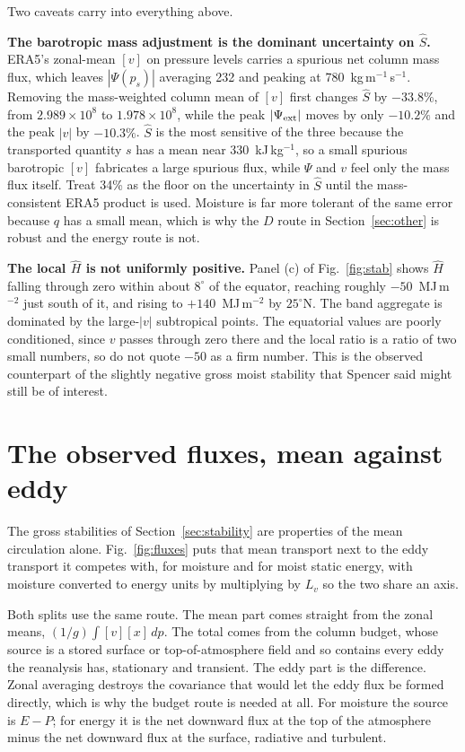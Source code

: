 \documentclass[11pt]{article}
\newcommand{\Shat}{\hat S}
\newcommand{\Hhat}{\hat H}
\begin{document}
Two caveats carry into everything above.

\textbf{The barotropic mass adjustment is the dominant uncertainty on
$\Shat$.} ERA5's zonal-mean $[v]$ on pressure levels carries a spurious net
column mass flux, which leaves $|\Psi(p_s)|$ averaging 232 and peaking at
780~kg\,m$^{-1}$\,s$^{-1}$. Removing the mass-weighted column mean of $[v]$
first changes $\Shat$ by $-33.8\%$, from $2.989\times10^{8}$ to
$1.978\times10^{8}$, while the peak $|\Psi_{\rm ext}|$ moves by only $-10.2\%$
and the peak $|v|$ by $-10.3\%$. $\Shat$ is the most sensitive of the three
because the transported quantity $s$ has a mean near 330~kJ\,kg$^{-1}$, so a
small spurious barotropic $[v]$ fabricates a large spurious flux, while $\Psi$
and $v$ feel only the mass flux itself. Treat 34\% as the floor on the
uncertainty in $\Shat$ until the mass-consistent ERA5 product is used.
Moisture is far more tolerant of the same error because $q$ has a small mean,
which is why the $D$ route in Section~\ref{sec:other} is robust and the energy
route is not.

\textbf{The local $\Hhat$ is not uniformly positive.} Panel (c) of
Fig.~\ref{fig:stab} shows $\Hhat$ falling through zero within about
$8^\circ$ of the equator, reaching roughly $-50$~MJ\,m$^{-2}$ just south of it,
and rising to $+140$~MJ\,m$^{-2}$ by $25^\circ$N. The band aggregate is
dominated by the large-$|v|$ subtropical points. The equatorial values are
poorly conditioned, since $v$ passes through zero there and the local ratio is
a ratio of two small numbers, so do not quote $-50$ as a firm number. This is
the observed counterpart of the slightly negative gross moist stability that
Spencer said might still be of interest.

\section{The observed fluxes, mean against eddy}
\label{sec:fluxes}

The gross stabilities of Section~\ref{sec:stability} are properties of the mean
circulation alone. Fig.~\ref{fig:fluxes} puts that mean transport next to the
eddy transport it competes with, for moisture and for moist static energy, with
moisture converted to energy units by multiplying by $L_v$ so the two share an
axis.

Both splits use the same route. The mean part comes straight from the zonal
means, $(1/g)\int [v][x]\,dp$. The total comes from the column budget, whose
source is a stored surface or top-of-atmosphere field and so contains every
eddy the reanalysis has, stationary and transient. The eddy part is the
difference. Zonal averaging destroys the covariance that would let the eddy
flux be formed directly, which is why the budget route is needed at all. For
moisture the source is $E-P$; for energy it is the net downward flux at the top
of the atmosphere minus the net downward flux at the surface, radiative and
turbulent.
\end{document}
